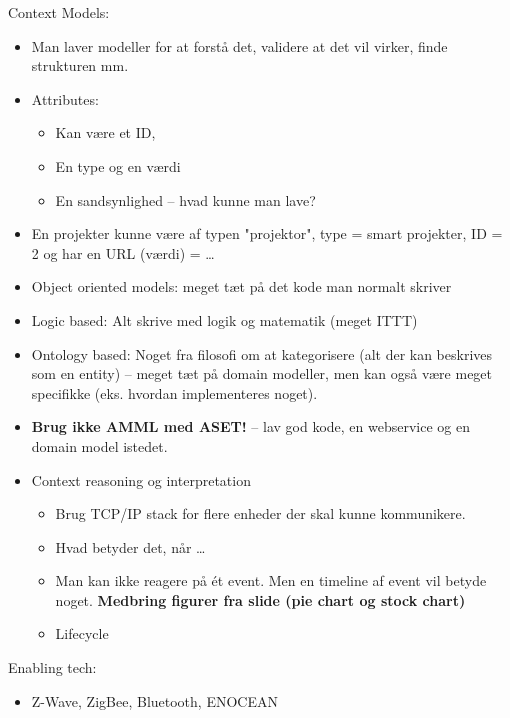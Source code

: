 \documentclass[oneside, 10pt]{article}
\begin{document}
Context Models:
\begin{itemize}
	\item Man laver modeller for at forstå det, validere at det vil virker, finde strukturen mm.
	\item Attributes:
	\begin{itemize}
		\item Kan være et ID,
		\item En type og en værdi
		\item En sandsynlighed -- hvad kunne man lave?
	\end{itemize}
	\item En projekter kunne være af typen "projektor", type = smart projekter, ID = 2 og har en URL (værdi) = \dots
	\item Object oriented models:  meget tæt på det kode man normalt skriver
	\item Logic based: Alt skrive med logik og matematik (meget ITTT)
	\item Ontology based: Noget fra filosofi om at kategorisere (alt der kan beskrives som en entity) -- meget tæt på domain modeller, men kan også være meget specifikke (eks. hvordan implementeres noget).
	\item \textbf{Brug ikke AMML med ASET!} -- lav god kode, en webservice og en domain model istedet.

	\item Context reasoning og interpretation
	\begin{itemize}
		\item Brug TCP/IP stack for flere enheder der skal kunne kommunikere.
		\item Hvad betyder det, når \dots
		\item Man kan ikke reagere på ét event. Men en timeline af event vil betyde noget. \textbf{Medbring figurer fra slide (pie chart og stock chart)}
	\end{itemize}
	\begin{itemize}
		\item Lifecycle
	\end{itemize}
\end{itemize}

Enabling tech:
\begin{itemize}
	\item Z-Wave, ZigBee, Bluetooth, ENOCEAN
\end{itemize}
\end{document}
